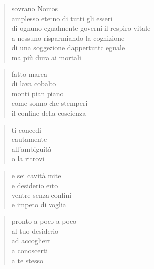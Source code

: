 \clearpage


\vspace*{2cm}

	\begin{verse}
		sovrano Nomos\\
		amplesso eterno di tutti gli esseri\\
		di ognuno egualmente governi il respiro vitale\\
		a nessuno risparmiando la cognizione\\
		di una soggezione dappertutto eguale\\
		ma più dura ai mortali
	\end{verse}

\clearpage


\vspace*{2cm}

	\begin{verse}
		fatto marea\\
		di lava cobalto\\
		monti pian piano\\
		come sonno che stemperi\\
		il confine della coscienza
	\end{verse}

	\begin{verse}
		ti concedi\\
		cautamente\\
		all’ambiguità\\
		o la ritrovi
	\end{verse}

	\begin{verse}
		e sei cavità mite\\
		e desiderio erto\\
		ventre senza confini\\
		e impeto di voglia
	\end{verse}

	\begin{verse}
		pronto a poco a poco\\
		al tuo desiderio\\
		ad accoglierti\\
		a conoscerti\\
		a te stesso
	\end{verse}

\clearpage


